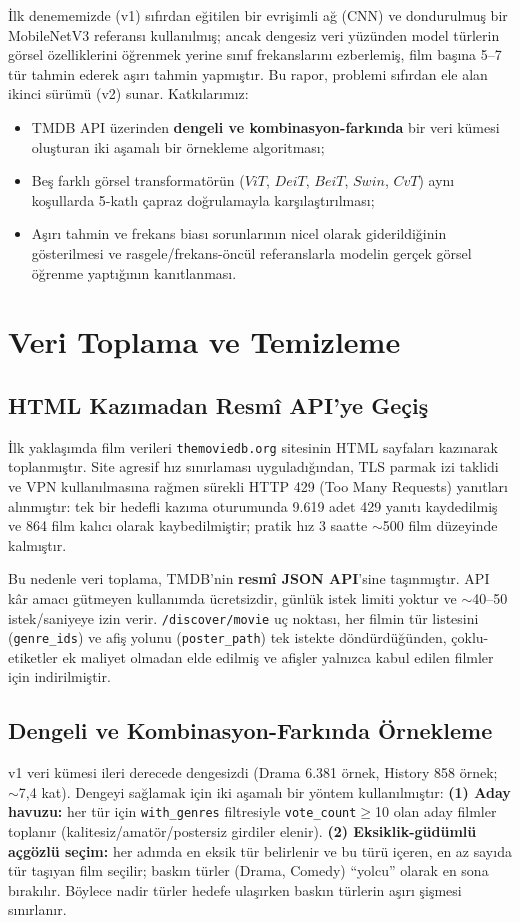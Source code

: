\documentclass[conference]{IEEEtran}
\begin{document}
İlk denememizde (v1) sıfırdan eğitilen bir evrişimli ağ (CNN) ve dondurulmuş bir
MobileNetV3 referansı kullanılmış; ancak dengesiz veri yüzünden model türlerin
görsel özelliklerini öğrenmek yerine sınıf frekanslarını ezberlemiş, film başına
5--7 tür tahmin ederek aşırı tahmin yapmıştır. Bu rapor, problemi sıfırdan ele
alan ikinci sürümü (v2) sunar. Katkılarımız:
\begin{itemize}
\item TMDB API üzerinden \textbf{dengeli ve kombinasyon-farkında} bir veri kümesi
oluşturan iki aşamalı bir örnekleme algoritması;
\item Beş farklı görsel transformatörün ($ViT$, $DeiT$, $BeiT$, $Swin$, $CvT$)
aynı koşullarda 5-katlı çapraz doğrulamayla karşılaştırılması;
\item Aşırı tahmin ve frekans biası sorunlarının nicel olarak giderildiğinin
gösterilmesi ve rasgele/frekans-öncül referanslarla modelin gerçek görsel öğrenme
yaptığının kanıtlanması.
\end{itemize}

\section{Veri Toplama ve Temizleme}
\subsection{HTML Kazımadan Resmî API'ye Geçiş}
İlk yaklaşımda film verileri \texttt{themoviedb.org} sitesinin HTML sayfaları
kazınarak toplanmıştır. Site agresif hız sınırlaması uyguladığından, TLS parmak
izi taklidi ve VPN kullanılmasına rağmen sürekli HTTP 429 (Too Many Requests)
yanıtları alınmıştır: tek bir hedefli kazıma oturumunda 9.619 adet 429 yanıtı
kaydedilmiş ve 864 film kalıcı olarak kaybedilmiştir; pratik hız 3 saatte
$\sim$500 film düzeyinde kalmıştır.

Bu nedenle veri toplama, TMDB'nin \textbf{resmî JSON API}'sine taşınmıştır. API
kâr amacı gütmeyen kullanımda ücretsizdir, günlük istek limiti yoktur ve
$\sim$40--50 istek/saniyeye izin verir. \texttt{/discover/movie} uç noktası, her
filmin tür listesini (\texttt{genre\_ids}) ve afiş yolunu (\texttt{poster\_path})
tek istekte döndürdüğünden, çoklu-etiketler ek maliyet olmadan elde edilmiş ve
afişler yalnızca kabul edilen filmler için indirilmiştir.

\subsection{Dengeli ve Kombinasyon-Farkında Örnekleme}
v1 veri kümesi ileri derecede dengesizdi (Drama 6.381 örnek, History 858 örnek;
$\sim$7,4 kat). Dengeyi sağlamak için iki aşamalı bir yöntem kullanılmıştır:
\textbf{(1) Aday havuzu:} her tür için \texttt{with\_genres} filtresiyle
\texttt{vote\_count}$\geq$10 olan aday filmler toplanır (kalitesiz/amatör/postersiz
girdiler elenir). \textbf{(2) Eksiklik-güdümlü açgözlü seçim:} her adımda en eksik
tür belirlenir ve bu türü içeren, en az sayıda tür taşıyan film seçilir; baskın
türler (Drama, Comedy) ``yolcu'' olarak en sona bırakılır. Böylece nadir türler
hedefe ulaşırken baskın türlerin aşırı şişmesi sınırlanır.
\end{document}
